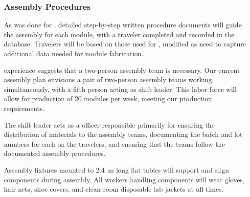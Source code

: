 
\subsubsection{Assembly Procedures}


As was done for , detailed step-by-step written procedure documents will %
guide the assembly for each  module, with a  traveler %
completed and recorded in the database.  Travelers will be based on those used for , modified as need to capture additional data needed for  module fabrication.

 experience suggests that a two-person assembly team is necessary. %
Our current assembly plan envisions a pair of two-person assembly teams working simultaneously, %
with a fifth person acting as shift leader.  This labor force will allow for production of 20  modules per week, meeting our ptoduction requirements.  

The shift leader %
acts as a  officer responsible primarily for ensuring the distribution of materials to the assembly teams, documenting the batch and lot numbers for each  on the %
travelers, and ensuring that the teams follow the documented assembly procedures. %

Assembly fixtures mounted to \SI{2.4}{m} long flat tables will %
support and align  components during assembly.  All workers handling  components will wear gloves, hair nets, shoe covers, and clean-room disposable lab jackets at all times.


